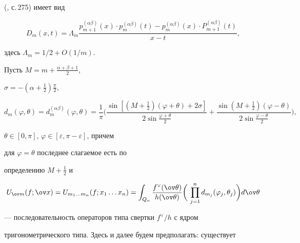 (\cite{1}, с.\,275) имеет вид 


\begin{equation} 


D_m(x,t)=\Lambda_m 


\frac{p^{(\alpha\beta)}_{m+1}(x)\cdot p^{(\alpha\beta)}_m(t)- 


p^{(\alpha\beta)}_m(x)\cdot P^{(\alpha\beta)}_{m+1}(t)} 


{x-t}, 


\end{equation} 


здесь $\Lambda_m=1/2+O(1/m)$. 


 


Пусть $M=m+\frac{\alpha+\beta+1}{2}$, 


$\sigma=-(\alpha+\frac{1}{2})\frac{\pi}{2}$,


\begin{equation} 


d_m(\varphi,\theta)=d^{(\alpha\beta)}_m(\varphi,\theta)= 


\frac{1}{\pi}\bigg( 


\frac{\sin[(M+\frac{1}{2})(\varphi+\theta)+2\sigma]} 


{2\sin\frac{\varphi+\theta}{2}}+ 


\frac{\sin(M+\frac{1}{2})(\varphi-\theta)} 


{2\sin\frac{\varphi-\theta}{2}} 


\bigg), 


\end{equation} 


$\theta\in[0,\pi]$, $\varphi\in[\varepsilon,\pi-\varepsilon]$, причем 


для $\varphi=\theta$ последнее слагаемое есть по 


определению $M+\frac{1}{2}$ и 


\begin{equation} 


U_{\ov m}(f;\ov x)=U_{m_1\dotsc m_n}(f;x_1\dotsc x_n)= 


\int_{Q_n}\frac{f^\vee(\ov\theta)}{h(\ov\theta)}\bigg(\, 


\prod^n_{j=1}d_{m_j}(\varphi_j,\theta_j)\bigg)d\ov\theta 


\end{equation} 


--- последовательность операторов типа свертки $f^\vee/h$ с ядром 


тригонометрического типа. Здесь и далее будем предполагать: существует 


